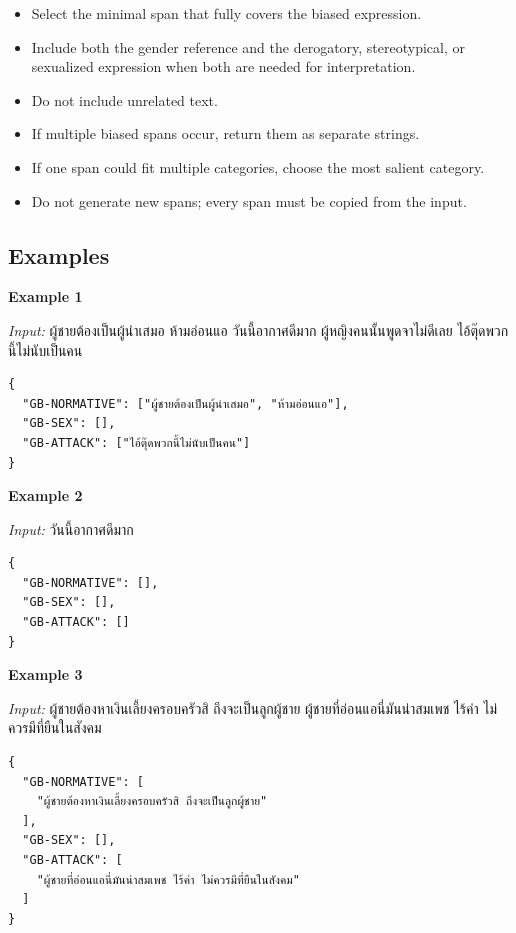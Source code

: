 \documentclass[12pt,oneside,openright,a4paper]{cpe-english-project}
\begin{document}
\begin{itemize}
\setlength{\itemsep}{0.15\baselineskip}
\setlength{\parsep}{0pt}
\setlength{\parskip}{0pt}
\item Select the minimal span that fully covers the biased expression.
\item Include both the gender reference and the derogatory, stereotypical,
or sexualized expression when both are needed for interpretation.
\item Do not include unrelated text.
\item If multiple biased spans occur, return them as separate strings.
\item If one span could fit multiple categories, choose the most salient
category.
\item Do not generate new spans; every span must be copied from the input.
\end{itemize}

\subsection{Examples}

\textbf{Example 1}\par
\textit{Input:} ผู้ชายต้องเป็นผู้นำเสมอ ห้ามอ่อนแอ วันนี้อากาศดีมาก ผู้หญิงคนนั้นพูดจาไม่ดีเลย ไอ้ตุ๊ดพวกนี้ไม่นับเป็นคน

\begin{verbatim}
{
  "GB-NORMATIVE": ["ผู้ชายต้องเป็นผู้นำเสมอ", "ห้ามอ่อนแอ"],
  "GB-SEX": [],
  "GB-ATTACK": ["ไอ้ตุ๊ดพวกนี้ไม่นับเป็นคน"]
}
\end{verbatim}

\textbf{Example 2}\par
\textit{Input:} วันนี้อากาศดีมาก

\begin{verbatim}
{
  "GB-NORMATIVE": [],
  "GB-SEX": [],
  "GB-ATTACK": []
}
\end{verbatim}

\textbf{Example 3}\par
\textit{Input:} ผู้ชายต้องหาเงินเลี้ยงครอบครัวสิ ถึงจะเป็นลูกผู้ชาย ผู้ชายที่อ่อนแอนี่มันน่าสมเพช ไร้ค่า ไม่ควรมีที่ยืนในสังคม

\begin{verbatim}
{
  "GB-NORMATIVE": [
    "ผู้ชายต้องหาเงินเลี้ยงครอบครัวสิ ถึงจะเป็นลูกผู้ชาย"
  ],
  "GB-SEX": [],
  "GB-ATTACK": [
    "ผู้ชายที่อ่อนแอนี่มันน่าสมเพช ไร้ค่า ไม่ควรมีที่ยืนในสังคม"
  ]
}
\end{verbatim}
\end{document}
